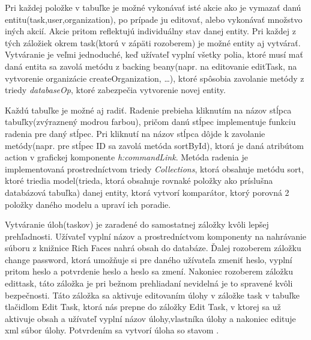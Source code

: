  Pri každej položke v tabuľke je možné vykonávať isté akcie ako je vymazať danú entitu(task,user,organization), po prípade ju editovať, alebo vykonávať množstvo iných akcií. Akcie pritom reflektujú individuálny stav danej entity. Pri každej z tých záložiek okrem task(ktorú v zápäti rozoberem) je možné entity aj vytvárať. Vytváranie je veľmi jednoduché, keď užívateľ vyplní všetky polia, ktoré musí mať daná entita sa zavolá metódu z backing beany(napr. na editovanie editTask, na vytvorenie organizácie createOrganization, \ldots), ktoré spôsobia zavolanie metódy z triedy \emph{databaseOp}, ktoré zabezpečia vytvorenie novej entity. 

 Každú tabuľke je možné aj radiť. Radenie prebieha kliknutím na názov stĺpca tabuľky(zvýraznený modrou farbou), pričom danú stĺpec implementuje funkciu radenia pre daný stĺpec. Pri kliknutí na názov stĺpca dôjde k zavolanie metódy(napr. pre stĺpec ID sa zavolá metóda sortById), ktorá je daná atribútom action v grafickej komponente \emph{h:commandLink}. Metóda radenia je implementovaná prostredníctvom triedy \emph{Collections}, ktorá obsahuje metódu sort, ktoré triedia model(trieda, ktorá obsahuje rovnaké položky ako príslušna databázová tabuľka) danej entity, ktorá vytvorí komparátor, ktorý porovná 2 položky daného modelu a upraví ich poradie.


Vytváranie úloh(taskov) je zaradené do samostatnej záložky kvôli lepšej prehľadnosti. Užívateľ vyplní názov a prostredníctvom komponenty na nahrávanie súboru z knižnice Rich Faces nahrá obsah do databáze. Ďalej rozoberem záložku change password, ktorá umožňuje si pre daného užívateľa zmeniť heslo, vyplní pritom heslo a potvrdenie heslo a heslo sa zmení. Nakoniec rozoberem záložku edittask, táto záložka je pri bežnom prehliadaní nevidelná je to spravené kvôli bezpečnosti. Táto záložka sa aktivuje editovaním úlohy v záložke task v tabuľke tlačidlom Edit Task, ktorá nás prepne do záložky Edit Task, v ktorej sa už aktivuje obsah a užívateľ vyplní názov úlohy,vlastníka úlohy a nakoniec edituje xml súbor úlohy. Potvrdením sa vytvorí úloha so stavom .


